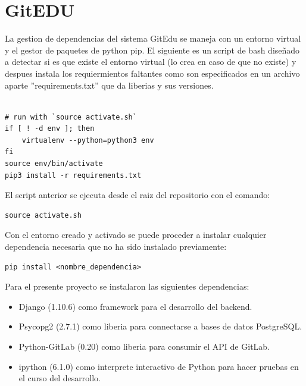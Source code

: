 

\section{GitEDU}

La gestion de dependencias del sistema GitEdu se maneja con un entorno virtual y el gestor de paquetes de python pip. El siguiente es un script de bash diseñado a detectar si es que existe el entorno virtual (lo crea en caso de que no existe) y despues instala los requiermientos faltantes como son especificados en un archivo aparte ''requirements.txt'' que da liberias y sus versiones.

\begin{lstlisting}

# run with `source activate.sh` 
if [ ! -d env ]; then
	virtualenv --python=python3 env
fi
source env/bin/activate
pip3 install -r requirements.txt

\end{lstlisting}

El script anterior se ejecuta desde el raiz del repositorio con el comando:

\begin{lstlisting}
source activate.sh
\end{lstlisting}

Con el entorno creado y activado se puede proceder a instalar cualquier dependencia necesaria que no ha sido instalado previamente:

\begin{lstlisting}
pip install <nombre_dependencia>
\end{lstlisting}

Para el presente proyecto se instalaron las siguientes dependencias:
\begin{itemize}
	\item Django (1.10.6) como framework para el desarrollo del backend.
    \item Psycopg2 (2.7.1) como liberia para connectarse a bases de datos PostgreSQL.
    \item Python-GitLab (0.20) como liberia para consumir el API de GitLab.
    \item ipython (6.1.0) como interprete interactivo de Python para hacer pruebas en el curso del desarrollo.
\end{itemize}

